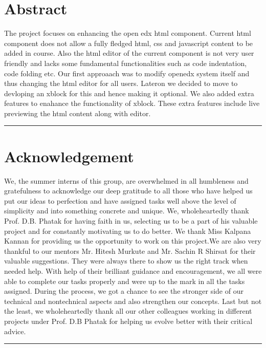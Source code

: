 \documentclass[a4paper, twosided, openany]{memoir}
\begin{document}
\chapter*{Abstract}
The project focuses on enhancing the open edx html component. Current html component does not
allow a fully fledged html, css and javascript content to be added in course. Also the html editor of
the current component is not very user friendly and lacks some fundamental functionalities such as
code indentation, code folding etc. Our first approaach was to modify openedx system itself and
thus changing the html editor for all users. Lateron we decided to move to devloping an xblock for
this and hence making it optional. We also added extra features to enahance the functionality of
xblock. These extra features include live previewing the html content along with editor.\newline
\par\fancybreak{$***$}\par

\newpage

\chapter*{Acknowledgement}
	We, the summer interns of this group, are overwhelmed in all humbleness and
gratefulness to acknowledge our deep gratitude to all those who have helped us put
our ideas to perfection and have assigned tasks well above the level of simplicity and
into something concrete and unique.
We, wholeheartedly thank Prof. D.B. Phatak for having faith in us, selecting us to be
a part of his valuable project and for constantly motivating us to do better.
We thank Miss Kalpana Kannan for providing us the opportunity to work on this
project.We are also very thankful to our mentors Mr. Hitesh Murkute and Mr. Sachin R Shirsat
for their valuable suggestions. They were always there to show us the right track when needed help.
With help of their brilliant guidance and encouragement, we all were able to complete
our tasks properly and were up to the mark in all the tasks assigned. During the
process, we got a chance to see the stronger side of our technical and nontechnical
aspects and also strengthen our concepts.
Last but not the least, we wholeheartedly thank all our other colleagues working in
different projects under Prof. D.B Phatak for helping us evolve better with their critical advice.\newline
\par\fancybreak{$***$}\par
\newpage

\tableofcontents

\mainmatter










\end{document}
